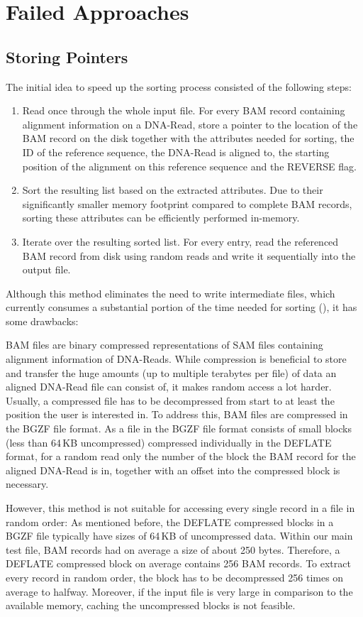 \section{Failed Approaches}
\subsection{Storing Pointers}
The initial idea to speed up the sorting process consisted of the following steps: 
\begin{enumerate}
    \item Read once through the whole input file. For every BAM record containing alignment information on a DNA-Read, store a pointer to the location of the BAM record on the disk together with the attributes needed for sorting, the ID of the reference sequence, the DNA-Read is aligned to, the starting position of the alignment on this reference sequence and the REVERSE flag.
    \item Sort the resulting list based on the extracted attributes. Due to their significantly smaller memory footprint compared to complete BAM records, sorting these attributes can be efficiently performed in-memory.
    \item Iterate over the resulting sorted list. For every entry, read the referenced BAM record from disk using random reads and write it sequentially into the output file.
\end{enumerate}

Although this method eliminates the need to write intermediate files, which currently consumes a substantial portion of the time needed for sorting (), it has some drawbacks: 

BAM files are binary compressed representations of SAM files containing alignment information of DNA-Reads. While compression is beneficial to store and transfer the huge amounts (up to multiple terabytes per file) of data an aligned DNA-Read file can consist of, it makes random access a lot harder. Usually, a compressed file has to be decompressed from start to at least the position the user is interested in. To address this, BAM files are compressed in the BGZF file format. As a file in the BGZF file format consists of small blocks (less than 64\,KB uncompressed) compressed individually in the  DEFLATE format, for a random read only the number of the block the BAM record for the aligned DNA-Read is in, together with an offset into the compressed block is necessary. 

However, this method is not suitable for accessing every single record in a file in random order:
As mentioned before, the DEFLATE compressed blocks in a BGZF file typically have sizes of 64\,KB of uncompressed data. Within our main test file, BAM records had on average a size of about 250 bytes. Therefore, a DEFLATE compressed block on average contains 256 BAM records. To extract every record in random order, the block has to be decompressed 256 times on average to halfway. Moreover, if the input file is very large in comparison to the available memory, caching  the uncompressed blocks is not feasible. 

